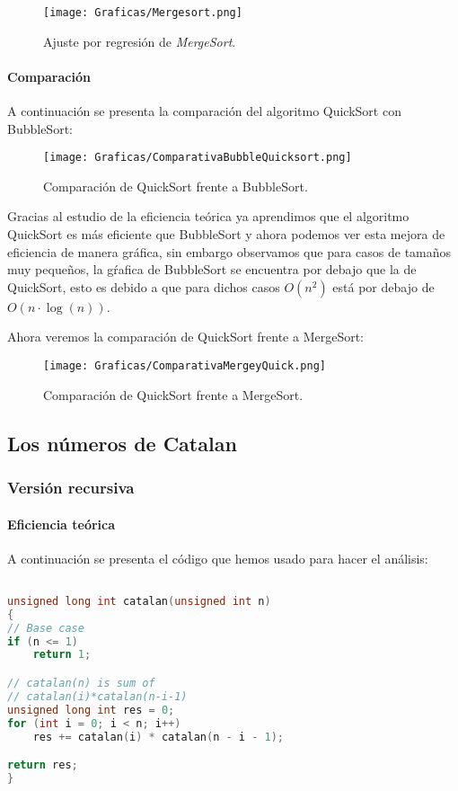 \documentclass[a4paper,12pt]{article} %
\begin{document}
\begin{figure}[H]
	\centering
	\texttt{[image: Graficas/Mergesort.png]}
	\caption{Ajuste por regresión de \textit{MergeSort}.}
\end{figure}


\paragraph{Comparación}

A continuación se presenta la comparación del algoritmo QuickSort con BubbleSort:

\begin{figure}[H]
	\centering
	\texttt{[image: Graficas/ComparativaBubbleQuicksort.png]}
	\caption{Comparación de QuickSort frente a BubbleSort.}
\end{figure}

Gracias al estudio de la eficiencia teórica ya aprendimos que el algoritmo QuickSort es más eficiente que
BubbleSort y ahora podemos ver esta mejora de eficiencia de manera gráfica, sin embargo observamos que para
casos de tamaños muy pequeños, la gŕafica de BubbleSort se encuentra por debajo que la de QuickSort, esto es debido
a que para dichos casos $O(n^2)$ está por debajo de $O(n\cdot \log (n))$.

Ahora veremos la comparación de QuickSort frente a MergeSort:

\begin{figure}[H]
	\centering
	\texttt{[image: Graficas/ComparativaMergeyQuick.png]}
	\caption{Comparación de QuickSort frente a MergeSort.}
\end{figure}


\subsection{Los números de Catalan}

\subsubsection{Versión recursiva}

\paragraph{Eficiencia teórica}

A continuación se presenta el código que hemos usado para hacer el análisis:

\begin{lstlisting}[language=C, caption={Código de Catalan recursivo}]

unsigned long int catalan(unsigned int n)
{
// Base case
if (n <= 1)
	return 1;

// catalan(n) is sum of
// catalan(i)*catalan(n-i-1)
unsigned long int res = 0;
for (int i = 0; i < n; i++)
	res += catalan(i) * catalan(n - i - 1);

return res;
}
	\end{lstlisting}
\end{document}
